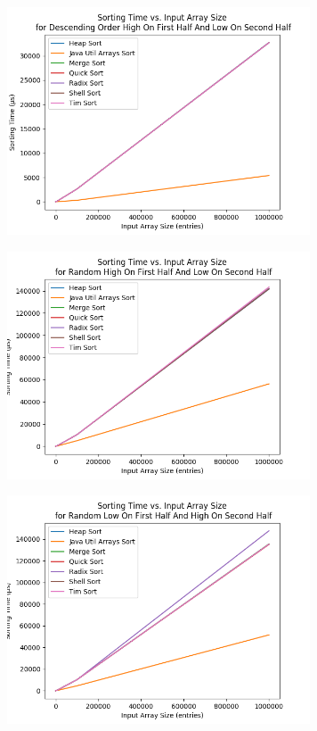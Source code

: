 \begin{figure}[!htp]
\centering
\includegraphics[width=9cm]{figures/plots_without_BubbleSort_InsertionSort/sorting_time_vs_input_array_size_DescendingOrderHighOnFirstHalfAndLowOnSecondHalf.png}
\end{figure}

\begin{figure}[!htp]
\centering
\includegraphics[width=9cm]{figures/plots_without_BubbleSort_InsertionSort/sorting_time_vs_input_array_size_RandomHighOnFirstHalfAndLowOnSecondHalf.png}
\end{figure}

\begin{figure}[!htp]
\centering
\includegraphics[width=9cm]{figures/plots_without_BubbleSort_InsertionSort/sorting_time_vs_input_array_size_RandomLowOnFirstHalfAndHighOnSecondHalf.png}
\end{figure}

